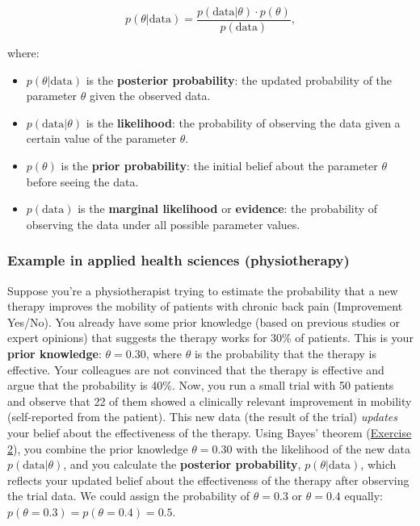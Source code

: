 \documentclass[
]{book}
\begin{document}
\[
p(\theta | \text{data}) = \frac{p(\text{data} | \theta) \cdot p(\theta)}{p(\text{data})},
\]

where:

\begin{itemize}
\item
  \(p(\theta | \text{data})\) is the \textbf{posterior probability}: the updated probability of the parameter \(\theta\) given the observed data.
\item
  \(p(\text{data} | \theta)\) is the \textbf{likelihood}: the probability of observing the data given a certain value of the parameter \(\theta\).
\item
  \(p(\theta)\) is the \textbf{prior probability}: the initial belief about the parameter \(\theta\) before seeing the data.
\item
  \(p(\text{data})\) is the \textbf{marginal likelihood} or \textbf{evidence}: the probability of observing the data under all possible parameter values.
\end{itemize}

\subsubsection{Example in applied health sciences (physiotherapy)}\label{example1_physio}

Suppose you're a physiotherapist trying to estimate the probability that a new therapy improves the mobility of patients with chronic back pain (Improvement Yes/No).
You already have some prior knowledge (based on previous studies or expert opinions) that suggests the therapy works for 30\% of patients.
This is your \textbf{prior knowledge}: \(\theta = 0.30\), where \(\theta\) is the probability that the therapy is effective.
Your colleagues are not convinced that the therapy is effective and argue that the probability is 40\%.
Now, you run a small trial with 50 patients and observe that 22 of them showed a clinically relevant improvement in mobility (self-reported from the patient).
This new data (the result of the trial) \emph{updates} your belief about the effectiveness of the therapy.
Using Bayes' theorem (\hyperref[exercise2]{Exercise 2}), you combine the prior knowledge \(\theta = 0.30\) with the likelihood of the new data \(p(\text{data} | \theta)\), and you calculate
the \textbf{posterior probability}, \(p(\theta | \text{data})\), which reflects your updated belief about the effectiveness of the therapy after observing the trial data.
We could assign the probability of \(\theta = 0.3\) or \(\theta = 0.4\) equally: \(p(\theta = 0.3) = p(\theta = 0.4) = 0.5\).
\end{document}
